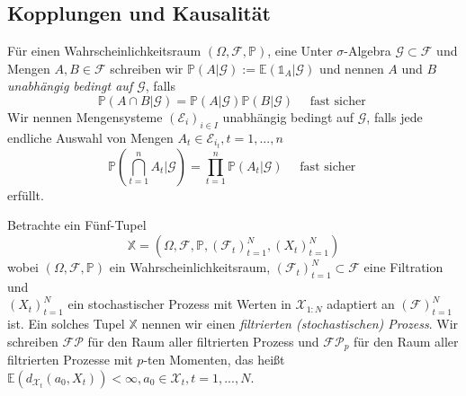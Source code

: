 \subsection{Kopplungen und Kausalität}
\begin{definition}
    Für einen Wahrscheinlichkeitsraum $(\Omega, \mathcal{F}, \mathbb{P})$, eine Unter $\sigma$-Algebra $\mathcal{G} \subset \mathcal{F}$ und Mengen $A, B \in \mathcal{F}$ schreiben wir $\mathbb{P}(A \vert \mathcal{G}) := \mathbb{E}(\mathds{1}_A\vert \mathcal{G})$ und nennen $A$ und $B$ \emph{unabhängig bedingt auf $\mathcal{G}$}, falls
    \begin{equation}\label{eq:def_cond_ind}
    \mathbb{P}(A\cap B\vert \mathcal{G}) = \mathbb{P}(A\vert \mathcal{G}) \mathbb{P}(B \vert \mathcal{G}) \quad \text{ fast sicher }
    \end{equation}
    Wir nennen Mengensysteme $(\mathcal{E}_i)_{i\in I}$ unabhängig bedingt auf $\mathcal{G}$, falls jede endliche Auswahl von Mengen $A_t \in \mathcal{E}_{i_t}, t=1,...,n$ 
    $$\mathbb{P}\left(\bigcap_{t=1}^n A_t\vert \mathcal{G}\right) = \prod_{t=1}^n \mathbb{P}(A_t \vert \mathcal{G}) \quad \text{ fast sicher }$$
    erfüllt.
\end{definition}
\begin{definition}
Betrachte ein Fünf-Tupel
$$\mathbb{X}=\left(\Omega, \mathcal{F}, \mathbb{P}, \left(\mathcal{F}_t\right)_{t=1}^N, \left(X_t\right)_{t=1}^N\right)$$
wobei $(\Omega, \mathcal{F}, \mathbb{P})$ ein Wahrscheinlichkeitsraum, $\left(\mathcal{F}_t\right)_{t=1}^N\subset \mathcal{F}$ eine Filtration und \\
$(X_t)_{t=1}^N$ ein stochastischer Prozess mit Werten in $\mathcal{X}_{1:N}$ adaptiert an $(\mathcal{F})_{t=1}^N$ ist. Ein solches Tupel $\mathbb{X}$ nennen wir einen \emph{filtrierten (stochastischen) Prozess}. Wir schreiben $\mathcal{FP}$ für den Raum aller filtrierten Prozess und $\mathcal{FP}_p$ für den Raum aller filtrierten Prozesse mit $p$-ten Momenten, das heißt $\mathbb{E}(d_{\mathcal{X}_t}(a_0, X_t))<\infty, a_0\in\mathcal{X}_t, t=1,...,N$.
\end{definition}
